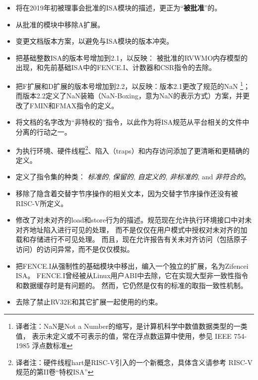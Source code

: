 \vspace{-0.2in}
\begin{itemize}
\parskip 0pt
\itemsep 1pt
\item 将在2019年初被理事会批准的ISA模块的描述，更正为“{\bf 被批准}”的。

\item 从批准的模块中移除A扩展。

\item 变更文档版本方案，以避免与ISA模块的版本冲突。

\item 把基础整数ISA的版本号增加到2.1，以反映：
  被批准的RVWMO内存模型的出现，和先前基础ISA中的FENCE.I、计数器和CSR指令的去除。

\item 把F扩展和D扩展的版本号增加到2.2，以反映：版本2.1更改了规范的NaN
\footnote{译者注：NaN是Not a Number的缩写，是计算机科学中数值数据类型的一类值，
表示未定义或不可表示的值，常在浮点数运算中使用，参见 IEEE 754-1985 浮点数标准}；
而版本2.2定义了NaN装箱（NaN-Boxing，意为NaN的表示方式）方案，并更改了FMIN和FMAX指令的定义。

\item 将文档的名字改为“非特权的”指令，以此作为将ISA规范从平台相关的文件中分离的行动之一。

\item 为执行环境、硬件线程\footnote{译者注：硬件线程hart是RISC-V引入的一个新概念，具体含义请参考 RISC-V 规范的第II卷“特权ISA”}、陷入（traps）和内存访问添加了更清晰和更精确的定义。

\item 定义了指令集的种类： {\em 标准的}, {\em 保留的}, {\em 自定义的}, {\em 非标准的}, and {\em 非符合的}。

\item 移除了隐含着交替字节序操作的相关文本，因为交替字节序操作还没有被RISC-V所定义。

\item 修改了对未对齐的load和store行为的描述。规范现在允许执行环境接口中对未对齐地址陷入进行可见的处理，
而不是仅仅在用户模式中授权对未对齐的加载和存储进行不可见处理。
而且，现在允许报告有关未对齐访问（包括原子访问）的访问异常，而不是仅仅模拟。

\item 把FENCE.I从强制性的基础模块中移出，编入一个独立的扩展，名为Zifencei ISA。
FENCE.I曾经被从Linux用户ABI中去除，它在实现大型非一致性指令和数据缓存时是有问题的。
然而，它仍然是仅有的标准的取指一致性机制。

\item 去除了禁止RV32E和其它扩展一起使用的约束。


\end{itemize}
